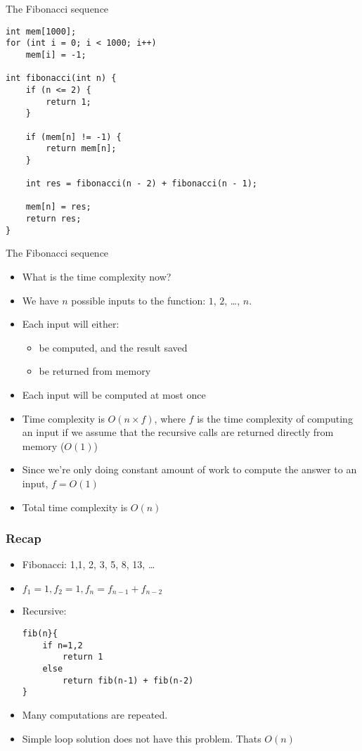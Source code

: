    \begin{frame}[fragile]{The Fibonacci sequence}

    \begin{lstlisting}
int mem[1000];
for (int i = 0; i < 1000; i++)
    mem[i] = -1;

int fibonacci(int n) {
    if (n <= 2) {
        return 1;
    }

    if (mem[n] != -1) {
        return mem[n];
    }

    int res = fibonacci(n - 2) + fibonacci(n - 1);

    mem[n] = res;
    return res;
}
    \end{lstlisting}

\end{frame}

   \begin{frame}[fragile]{The Fibonacci sequence}
    \begin{itemize}
        \item What is the time complexity now?
        \item We have $n$ possible inputs to the function: $1$, $2$, \ldots, $n$.
        \item Each input will either:
            \begin{itemize}
                \item be computed, and the result saved
                \item be returned from memory
            \end{itemize}
        \item Each input will be computed at most once
        \item Time complexity is $O(n \times f)$, where $f$ is the time complexity of computing an input if we assume that the recursive calls are returned directly from memory ($O(1)$)
        \item Since we're only doing constant amount of work to compute the answer to an input, $f = O(1)$
        \item Total time complexity is $O(n)$
    \end{itemize}
\end{frame}

   \begin{frame}[fragile]\frametitle{Recap}
\begin{itemize}
\item Fibonacci: 1,1, 2, 3, 5, 8, 13, \ldots
\item $f_1 = 1, f_2 = 1, f_n = f_{n-1} + f_{n-2}$
\item Recursive:
\begin{lstlisting}
fib(n}{
	if n=1,2
		return 1
	else
		return fib(n-1) + fib(n-2)
}
\end{lstlisting}
\item Many computations are repeated.
\item Simple loop solution does not have this problem. Thats $O(n)$

\end{itemize}
\end{frame}

